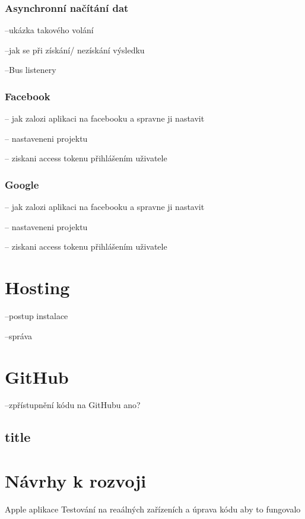 \documentclass[thesis=B,czech]{FITthesis}[2012/06/26]
\begin{document}
\subsubsection{Asynchronní načítání dat}

--ukázka takového volání 

--jak se při získání/ nezískání výsledku

--Bus listenery

\subsubsection{Facebook}

-- jak zalozi aplikaci na facebooku a spravne ji nastavit

-- nastaveneni projektu

-- ziskani access tokenu přihlášením uživatele 

\subsubsection{Google}

-- jak zalozi aplikaci na facebooku a spravne ji nastavit

-- nastaveneni projektu

-- ziskani access tokenu přihlášením uživatele 

\section{Hosting}

--postup instalace 

--správa

\section{GitHub}

--zpřístupnění kódu na GitHubu ano?



\subsection{title}

\section{Návrhy k rozvoji}
Apple aplikace 
Testování na reaálných zařízeních a úprava kódu aby to fungovalo
\end{document}
